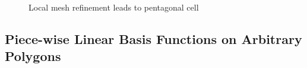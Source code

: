 \documentclass[preprint,10pt]{elsarticle}
\begin{document}
\begin{figure}[!hbtp]
\centering
\caption{Local mesh refinement leads to pentagonal cell}
\label{fig:amr}
\end{figure}


\subsection{Piece-wise Linear Basis Functions on Arbitrary Polygons}
\end{document}
